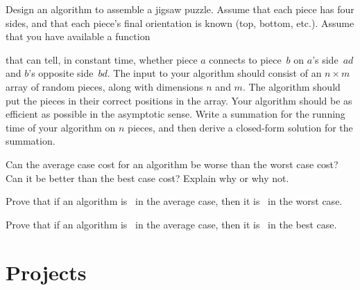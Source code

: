 \begin{exercises}
\item
Design an algorithm to assemble a jigsaw puzzle.
Assume that each piece has four sides, and that each piece's final
orientation is known (top, bottom, etc.).
Assume that you have available a function

\smallskip
{}

\smallskip
\noindent that can tell, in constant time, whether piece \(a\)
connects to piece~\(b\) on \(a\)'s side~\(ad\) and \(b\)'s opposite
side~\(bd\).
The input to your algorithm should consist of an \(n \times m\) array of
random pieces, along with dimensions \(n\) and \(m\).
The algorithm should put the pieces in their correct positions in the
array.
Your algorithm should be as efficient as possible in the asymptotic
sense.
Write a summation for the running time of your algorithm on
\(n\) pieces, and then derive a closed-form solution for the summation.

\item
Can the average case cost for an algorithm be worse than the worst
case cost? Can it be better than the best case cost?
Explain why or why not.

\item
Prove that if an algorithm is \Thetafn\ in the average case, then it is
\Omegafn\ in the worst case.

\item
Prove that if an algorithm is \Thetafn\ in the average case, then it is
\Ofn\ in the best case.

\end{exercises}

\section{Projects}

